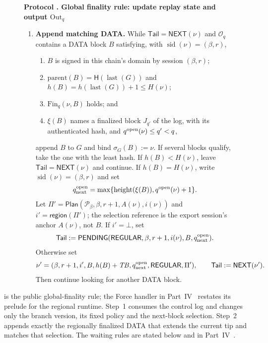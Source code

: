 \documentclass[11pt,a4paper]{article}
\newcommand{\Hash}{\mathsf H}
\newcommand{\TB}{\mathit{TB}}
\newcommand{\tagg}[1]{\ensuremath{\mathsf{#1}}}
\newcounter{protocol}
\newenvironment{protocol}[3][htbp]{\begin{figure}[#1]\refstepcounter{protocol}\label{#2}
\begin{mdframed}[linewidth=.6pt,skipabove=0pt,skipbelow=0pt,
innertopmargin=7pt,innerbottommargin=7pt]\small
\textbf{Protocol \theprotocol. #3}\par\smallskip}{\end{mdframed}\end{figure}}
\begin{document}
\begin{protocol}[H]{alg:global-rule}{Global finality rule: update replay state and output $\mathrm{Out}_q$}
\begin{enumerate}[label=\textbf{\arabic*)},itemsep=3pt]
\item \textbf{Append matching DATA.}
While $\mathsf{Tail}=\tagg{NEXT}(\nu)$ and $\mathcal O_q$ contains a
DATA block $B$ satisfying, with
$\operatorname{sid}(\nu)=(\beta,r)$,
  \begin{enumerate}[label=(\alph*),itemsep=1pt]
  \item $B$ is signed in this chain's domain by session $(\beta,r)$;
  \item $\mathrm{parent}(B)=\Hash(\operatorname{last}(G))$ and
  $h(B)=h(\operatorname{last}(G))+1\le H(\nu)$;
  \item $\mathrm{Fin}_q(\nu,B)$ holds; and
  \item $\xi(B)$ names a finalized block $J_{q'}$ of the log, with its
  authenticated hash, and $q^{\rm open}(\nu)\le q'<q$,
  \end{enumerate}
append $B$ to $G$ and bind $\sigma_G(B):=\nu$.  If several blocks
qualify, take the one with the least hash.  If $h(B)<H(\nu)$, leave
$\mathsf{Tail}=\tagg{NEXT}(\nu)$ and continue.  If $h(B)=H(\nu)$, write
$\operatorname{sid}(\nu)=(\beta,r)$ and set
\[
 q^{\rm open}_{\rm next}=
 \max\{\operatorname{height}(\xi(B)),q^{\rm open}(\nu)+1\}.
\]
Let $\Pi'=\tagg{Plan}(\mathcal P_\beta,\beta,r+1,A(\nu),i(\nu))$ and
$i'=\tagg{region}(\Pi')$; the selection reference is the
export session's anchor $A(\nu)$, not $B$. If $i'=\bot$, set
\[
 \mathsf{Tail}:=\tagg{PENDING}
 (\tagg{REGULAR},\beta,r+1,i(\nu),B,q^{\rm open}_{\rm next}).
\]
Otherwise set
\[
 \nu'=(\beta,r+1,i',B,h(B)+\TB,
       q^{\rm open}_{\rm next},\tagg{REGULAR},\Pi'),
 \qquad \mathsf{Tail}:=\tagg{NEXT}(\nu').
\]
Then continue looking for another DATA block.
\end{enumerate}
\end{protocol}

 is the public global-finality rule;
the Force handler in Part~IV~\cite{part4} restates its prelude for the regional runtime. Step~1 consumes the control log and changes only the
branch version, its fixed policy and the next-block selection. Step~2
appends exactly the regionally finalized DATA that extends the current
tip and matches that selection. The waiting rules are stated below and
in Part~IV~\cite{part4}.
\end{document}
